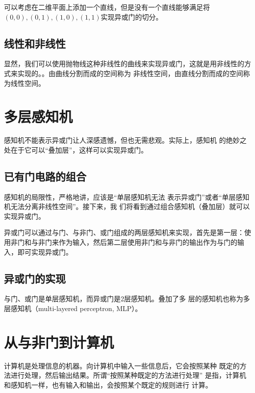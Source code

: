 可以考虑在二维平面上添加一个直线，但是没有一个直线能够满足将$(0, 0), (0, 1), (1, 0), (1,1)$实现异或门的切分。

\subsection{线性和非线性}
显然，我们可以使用抛物线这种非线性的曲线来实现异或门，这就是用非线性的方式来实现的。。由曲线分割而成的空间称为
非线性空间，由直线分割而成的空间称为线性空间。
\section{多层感知机}
感知机不能表示异或门让人深感遗憾，但也无需悲观。实际上，感知机
的绝妙之处在于它可以“叠加层”，这样可以实现异或门。
\subsection{已有门电路的组合}

\begin{tcolorbox}
    感知机的局限性，严格地讲，应该是“单层感知机无法
    表示异或门”或者“单层感知机无法分离非线性空间”。接下来，我
    们将看到通过组合感知机（叠加层）就可以实现异或门。
\end{tcolorbox}

异或门可以通过与门、与非门、或门组成的两层感知机来实现，首先是第一层：使用非门和与非门来作为输入，然后第二层使用非门和与非门的输出作为与门的输入，即可实现异或门。

\subsection{异或门的实现}
与门、或门是单层感知机，而异或门是2层感知机。叠加了多
层的感知机也称为多层感知机（multi-layered perceptron, MLP）。
\section{从与非门到计算机}
计算机是处理信息的机器。向计算机中输入一些信息后，它会按照某种
既定的方法进行处理，然后输出结果。所谓“按照某种既定的方法进行处理”
是指，计算机和感知机一样，也有输入和输出，会按照某个既定的规则进行
计算。
